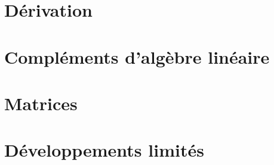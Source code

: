 \documentclass[13pt, twoside, a4paper, french]{report}
\begin{document}
    \chapter{Dérivation}\label{ch:derivation}
        


    \chapter{Compléments d'algèbre linéaire}\label{ch:complements-d-algebre-lineaire}
        


    \chapter{Matrices}\label{ch:matrices}
        
    
    \chapter{Développements limités}\label{ch:developpements-limites}
        
\end{document}
